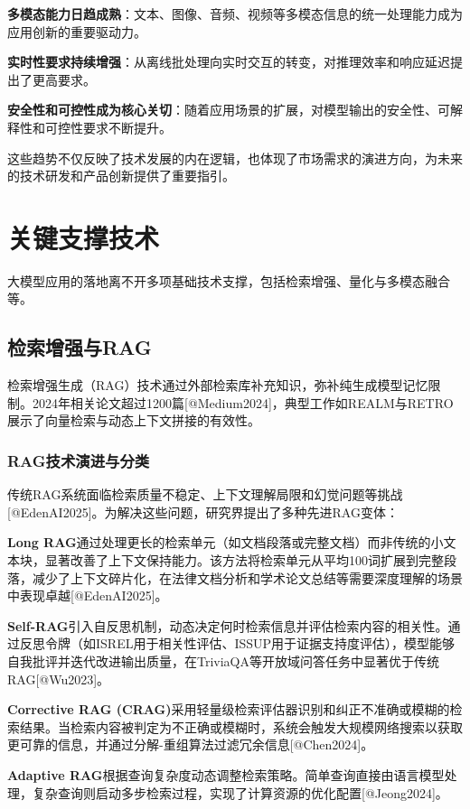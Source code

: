 \documentclass{article}
\begin{document}
\textbf{多模态能力日趋成熟}：文本、图像、音频、视频等多模态信息的统一处理能力成为应用创新的重要驱动力。

\textbf{实时性要求持续增强}：从离线批处理向实时交互的转变，对推理效率和响应延迟提出了更高要求。

\textbf{安全性和可控性成为核心关切}：随着应用场景的扩展，对模型输出的安全性、可解释性和可控性要求不断提升。

这些趋势不仅反映了技术发展的内在逻辑，也体现了市场需求的演进方向，为未来的技术研发和产品创新提供了重要指引。

\section{关键支撑技术}
大模型应用的落地离不开多项基础技术支撑，包括检索增强、量化与多模态融合等。

\subsection{检索增强与RAG}
检索增强生成（RAG）技术通过外部检索库补充知识，弥补纯生成模型记忆限制。2024年相关论文超过1200篇[@Medium2024]，典型工作如REALM与RETRO展示了向量检索与动态上下文拼接的有效性。

\subsubsection{RAG技术演进与分类}
传统RAG系统面临检索质量不稳定、上下文理解局限和幻觉问题等挑战[@EdenAI2025]。为解决这些问题，研究界提出了多种先进RAG变体：

\textbf{Long RAG}通过处理更长的检索单元（如文档段落或完整文档）而非传统的小文本块，显著改善了上下文保持能力。该方法将检索单元从平均100词扩展到完整段落，减少了上下文碎片化，在法律文档分析和学术论文总结等需要深度理解的场景中表现卓越[@EdenAI2025]。

\textbf{Self-RAG}引入自反思机制，动态决定何时检索信息并评估检索内容的相关性。通过反思令牌（如ISREL用于相关性评估、ISSUP用于证据支持度评估），模型能够自我批评并迭代改进输出质量，在TriviaQA等开放域问答任务中显著优于传统RAG[@Wu2023]。

\textbf{Corrective RAG (CRAG)}采用轻量级检索评估器识别和纠正不准确或模糊的检索结果。当检索内容被判定为不正确或模糊时，系统会触发大规模网络搜索以获取更可靠的信息，并通过分解-重组算法过滤冗余信息[@Chen2024]。

\textbf{Adaptive RAG}根据查询复杂度动态调整检索策略。简单查询直接由语言模型处理，复杂查询则启动多步检索过程，实现了计算资源的优化配置[@Jeong2024]。
\end{document}
